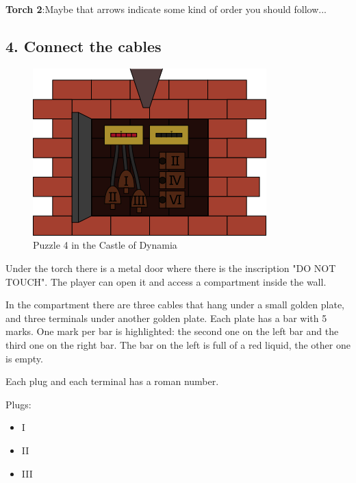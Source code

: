 \textbf{Torch 2}:Maybe that arrows indicate some kind of order you should follow...

\subsection{4. Connect the cables}

\begin{figure}[H]
  \centering
  \includegraphics[width=\textwidth]{Images/Puzzles/castleOfDynamia4}
  \caption{Puzzle 4 in the Castle of Dynamia}
\end{figure}


Under the torch there is a metal door where there is the inscription "DO NOT TOUCH". The player can open it and access a compartment inside the wall.

In the compartment there are three cables that hang under a small golden plate, and three terminals under another golden plate. Each plate has a bar with 5 marks. One mark per bar is highlighted: the second one on the left bar and the third one on the right bar. The bar on the left is full of a red liquid, the other one is empty.

Each plug and each terminal has a roman number.

Plugs:
\begin{itemize}
	\item I
	\item II
	\item III
\end{itemize}

